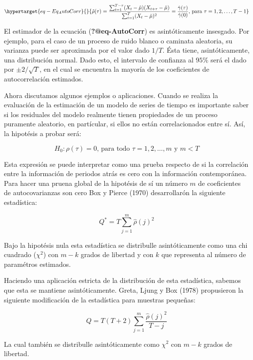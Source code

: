 \documentclass[
  a4paper,
]{article}
\begin{document}
\begin{equation}\protect\hypertarget{eq-Eq_AutoCorr}{}{
\hat{\rho}(\tau) = \frac{\sum^{T - \tau}_{t=1} (X_t - \hat{\mu})(X_{t+\tau} - \hat{\mu})}{\sum^T_{t=1} (X_t - \hat{\mu})^2} = \frac{\hat{\gamma}(\tau)}{\hat{\gamma}(0)} \mbox{, para } \tau = 1, 2, \ldots, T-1
}\label{eq-Eq_AutoCorr}\end{equation}

El estimador de la ecuación (\textbf{?@eq-AutoCorr}) es asintóticamente
insesgado. Por ejemplo, para el caso de un proceso de ruido blanco o
caminata aleatoria, su varianza puede ser aproximada por el valor dado
\(1/T\). Ésta tiene, asintóticamente, una distribución normal. Dado
esto, el intervalo de confianza al \(95\%\) será el dado por
\(\pm 2/\sqrt{T}\), en el cual se encuentra la mayoría de los
coeficientes de autocorrelación estimados.

Ahora discutamos algunos ejemplos o aplicaciones. Cuando se realiza la
evaluación de la estimación de un modelo de series de tiempo es
importante saber si los residuales del modelo realmente tienen
propiedades de un proceso puramente aleatorio, en partícular, si ellos
no están correlacionados entre sí. Así, la hipotésis a probar será:

\[
H_0 : \rho(\tau) = 0 \mbox{, para todo } \tau = 1, 2, \ldots, m \mbox{ y } m < T
\]

Esta expresión se puede interpretar como una prueba respecto de si la
correlación entre la información de periodos atrás es cero con la
información contemporánea. Para hacer una pruena global de la hipotésis
de sí un número \(m\) de coeficientes de autocovarianzas son cero Box y
Pierce (1970) desarrollarón la siguiente estadística:

\[
Q^* = T \sum_{j = 1}^{m} \hat{\rho} (j)^2
\]

Bajo la hipotésis nula esta estadística se distribulle asintóticamente
como una chi cuadrado (\(\chi^2\)) con \(m-k\) grados de libertad y con
\(k\) que representa al número de paramétros estimados.

Haciendo una aplicación estricta de la distribución de esta estadística,
sabemos que esta se mantiene asintóticamente. Greta, Ljung y Box (1978)
propusieron la siguiente modificación de la estadística para muestras
pequeñas:

\[
Q = T(T + 2) \sum_{j = 1}^{m} \frac{\hat{\rho} (j)^2}{T - j}
\]

La cual también se distribulle asintóticamente como \(\chi^2\) con
\(m-k\) grados de libertad.
\end{document}
